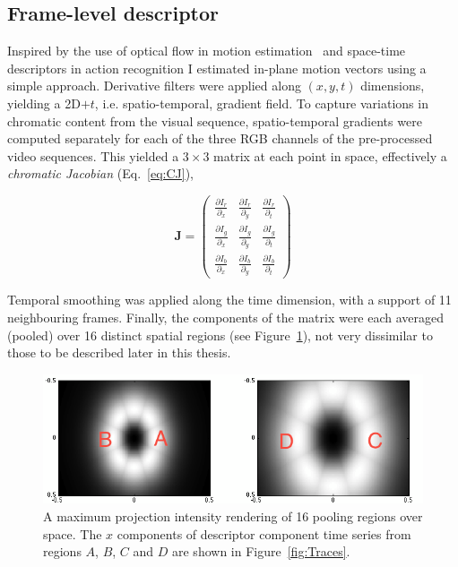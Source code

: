 \subsection{Frame-level descriptor}

Inspired by the use of optical flow in motion estimation~\citep{Weickert2006} and space-time descriptors in action recognition \citep{Wang2009} I estimated in-plane motion vectors using a simple approach.  Derivative filters were applied along $(x,y,t)$ dimensions, yielding a 2D$+t$, i.e. spatio-temporal, gradient field.  To capture variations in chromatic content from the visual sequence, spatio-temporal gradients were computed separately for each of the three RGB channels of the pre-processed video sequences.  This yielded a $3\times 3$ matrix at each point in space, effectively a \textit{chromatic Jacobian} (Eq.~\ref{eq:CJ}),	  

\begin{equation}
\mathbf{J} = \left (
\begin{array}{ccc}
\frac{\partial I_r}{\partial_x} & \frac{\partial I_r}{\partial_y}   & \frac{\partial I_r}{\partial_t} \\
\frac{\partial I_g}{\partial_x}   & \frac{\partial I_g}{\partial_y}  &  \frac{\partial I_g}{\partial_t} \\
\frac{\partial I_b}{\partial_x}  & \frac{\partial  I_b}{\partial_y}  &  \frac{\partial I_b}{\partial_t}
\end{array}
\right ) 
\label{eq:CJ}
\end{equation}

Temporal smoothing was applied along the time dimension, with a support of 11 neighbouring frames. Finally, the components of the matrix were each averaged (pooled) over 16 distinct spatial regions (see Figure~\ref{fig:pooling4lwcolor}), not very dissimilar to those to be described later in this thesis. 



\begin{figure}[h!]
\centering
\includegraphics[width=\linewidth]{./gfx/Chapter04/pooling_lwcolor.png}
\caption{A maximum projection intensity rendering of 16 pooling regions over space. The $x$ components of descriptor component time series from regions $A$, $B$, $C$ and $D$ are shown in Figure~\ref{fig:Traces}.}
\label{fig:pooling4lwcolor}
\end{figure}


